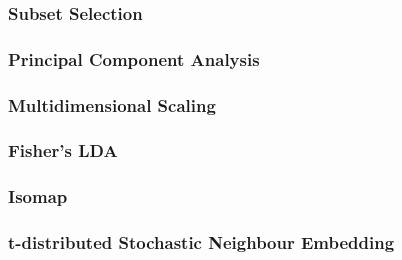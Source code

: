 \subsubsection{Subset Selection}

\subsubsection{Principal Component Analysis}

\subsubsection{Multidimensional Scaling}

\subsubsection{Fisher's LDA}

\subsubsection{Isomap}

\subsubsection{t-distributed Stochastic Neighbour Embedding}